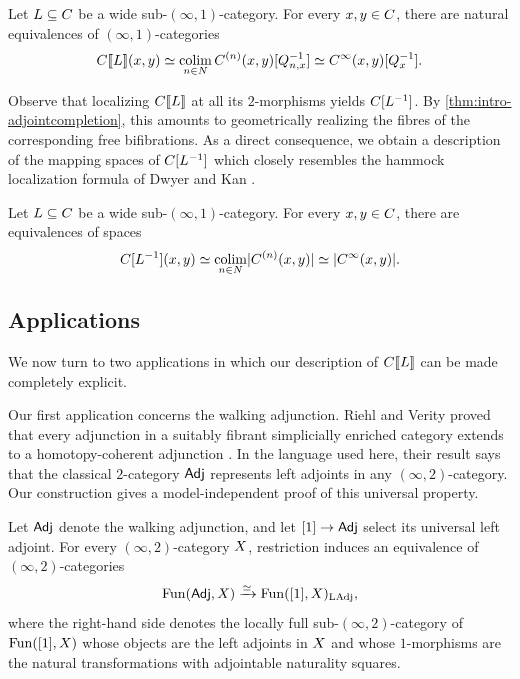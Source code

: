 \documentclass[a4paper,reqno,twoside]{amsart}
\begin{document}
\begin{thmint}\label{thm:intro-mappingformula}
	Let $\relax{L}\subseteq\relax{C}$ be a wide sub-$(\infty,1)$-category. For every $x,y\in\relax{C}$, there are natural equivalences of $(\infty,1)$-categories
	\[
		\relax{C}[\![\relax{L}]\!](x,y)
		\simeq
		\operatorname*{colim}_{n\in\relax N}\relax{C}^{(n)}(x,y)[\relax{Q}_{n,x}^{-1}]
		\simeq
		\relax{C}^{\infty}(x,y)[\relax{Q}_x^{-1}].
	\]
\end{thmint}

Observe that localizing $\relax{C}[\![\relax{L}]\!]$ at all its $2$-morphisms yields $\relax{C}[\relax{L}^{-1}]$. By \cref{thm:intro-adjointcompletion}, this amounts to geometrically realizing the fibres of the corresponding free bifibrations. As a direct consequence, we obtain a description of the mapping spaces of $\relax{C}[\relax{L}^{-1}]$ which closely resembles the hammock localization formula of Dwyer and Kan \cite{DwyerKan1980Calculating}.

\begin{corint}\label{cor:intro-hammock}
	Let $\relax{L}\subseteq\relax{C}$ be a wide sub-$(\infty,1)$-category. For every $x,y\in\relax{C}$, there are equivalences of spaces
	\[
		\relax{C}[\relax{L}^{-1}](x,y)
		\simeq
		\operatorname*{colim}_{n\in\relax N}\lvert\relax{C}^{(n)}(x,y)\rvert
		\simeq
		\lvert\relax{C}^{\infty}(x,y)\rvert.
	\]
\end{corint}
\subsection*{Applications}
We now turn to two applications in which our description of $\relax{C}[\![\relax{L}]\!]$ can be made completely explicit.

Our first application concerns the walking adjunction. Riehl and Verity proved that every adjunction in a suitably fibrant simplicially enriched category extends to a homotopy-coherent adjunction \cite{RiehlVerity2016FormalTheoryMonads}. In the language used here, their result says that the classical $2$-category $\mathsf{Adj}$ represents left adjoints in any $(\infty,2)$-category. Our construction gives a model-independent proof of this universal property.

\begin{thmint}\label{thm:intro-walking-adjunction}
	Let $\mathsf{Adj}$ denote the walking adjunction, and let $[1]\to\mathsf{Adj}$ select its universal left adjoint. For every $(\infty,2)$-category $\relax{X}$, restriction induces an equivalence of $(\infty,2)$-categories
	\[
		\mathrm{Fun}(\mathsf{Adj},\relax{X})\xrightarrow{\simeq}\mathrm{Fun}([1],\relax{X})_{\mathrm{LAdj}},
	\]
	where the right-hand side denotes the locally full sub-$(\infty,2)$-category of $\mathrm{Fun}([1],\relax{X})$ whose objects are the left adjoints in $\relax{X}$ and whose $1$-morphisms are the natural transformations with adjointable naturality squares.
\end{thmint}
\end{document}
